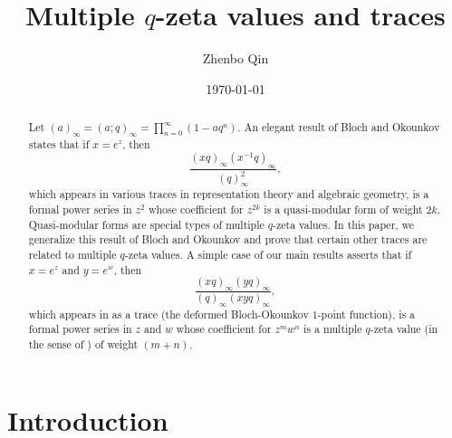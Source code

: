 \documentclass[12pt, reqno]{amsart}
\theoremstyle{definition}
\theoremstyle{remark}
\numberwithin{equation}{section}
\numberwithin{equation}{section}
\begin{document}
\title[Multiple $q$-zeta values and traces]
      {Multiple $q$-zeta values and traces}

\author[Zhenbo Qin]{Zhenbo Qin}
\address{Department of Mathematics, University of Missouri, 
         Columbia, MO 65211, USA} 

\date{\today}

\begin{abstract}
Let $(a)_\infty = (a; q)_\infty = \prod_{n=0}^\infty (1-aq^n)$. 
An elegant result of Bloch and Okounkov \cite{BO} states that 
if $x = e^z$, then 
$$
\frac{(xq)_\infty (x^{-1}q)_\infty}{(q)_\infty^2}, 
$$
which appears in various traces in representation theory and 
algebraic geometry, is a formal power series in $z^2$ whose 
coefficient for $z^{2k}$ is a quasi-modular form of weight $2k$. 
Quasi-modular forms are special types of multiple $q$-zeta values. 
In this paper, we generalize this result of Bloch and Okounkov and 
prove that certain other traces are related to multiple $q$-zeta values. 
A simple case of our main results asserts that 
if $x = e^z$ and $y = e^w$, then 
$$
\frac{(xq)_\infty (yq)_\infty}{(q)_\infty (xyq)_\infty}, 
$$
which appears in \cite[Theorem~5]{CW} as a trace (the deformed 
Bloch-Okounkov $1$-point function), 
is a formal power series in $z$ and $w$ whose coefficient for  
$z^mw^n$ is a multiple $q$-zeta value (in the sense of 
\cite{BK3, Oko}) of weight $(m+n)$.
\end{abstract}

\maketitle

\section{\bf Introduction} 
\label{sect_intr}
\end{document}
